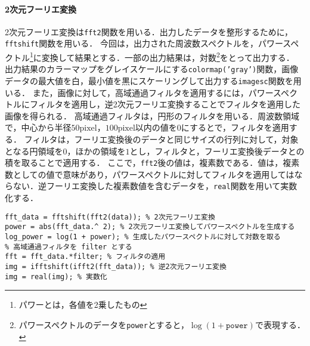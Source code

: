 \paragraph{2次元フーリエ変換}
2次元フーリエ変換は\texttt{fft2}関数を用いる．出力したデータを整形するために，\texttt{fftshift}関数を用いる．
今回は，出力された周波数スペクトルを，パワースペクトル\footnote{パワーとは，各値を2乗したもの}に変換して結果とする．一部の出力結果は，対数\footnote{パワースペクトルのデータを\texttt{power}とすると，\(\log(1+\texttt{power})\)で表現する．}をとって出力する．
出力結果のカラーマップをグレイスケールにする\texttt{colormap('gray')}関数，画像データの最大値を白，最小値を黒にスケーリングして出力する\texttt{imagesc}関数を用いる．
また，画像に対して，高域通過フィルタを適用するには，パワースペクトルにフィルタを適用し，逆2次元フーリエ変換することでフィルタを適用した画像を得られる．
高域通過フィルタは，円形のフィルタを用いる．周波数領域で，中心から半径\(50\textrm{pixel}\)，\(100\textrm{pixel}\)以内の値を\(0\)にするとで，フィルタを適用する．
フィルタは，フーリエ変換後のデータと同じサイズの行列に対して，対象となる円領域を\(0\)，ほかの領域を\(1\)とし，フィルタと，フーリエ変換後データとの積を取ることで適用する．
ここで，\texttt{fft2}後の値は，複素数である．値は，複素数としての値で意味があり，パワースペクトルに対してフィルタを適用してはならない．逆フーリエ変換した複素数値を含むデータを，\texttt{real}関数を用いて実数化する．
\begin{lstlisting}[caption={2次元フーリエ変換},label={src:2次元フーリエ変換}]
% 画像データを data とする
fft_data = fftshift(fft2(data)); % 2次元フーリエ変換
power = abs(fft_data.^ 2); % 2次元フーリエ変換してパワースペクトルを生成する
log_power = log(1 + power); % 生成したパワースペクトルに対して対数を取る
% 高域通過フィルタを filter とする
fft = fft_data.*filter; % フィルタの適用
img = ifftshift(ifft2(fft_data)); % 逆2次元フーリエ変換
img = real(img); % 実数化
	\end{lstlisting}
\newpage
